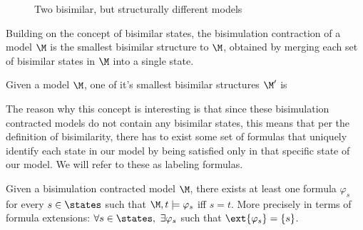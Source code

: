 \begin{figure}[h]
	\label{fig:bisimmods}
	\caption{Two bisimilar, but structurally different models}
	\centering
\end{figure}

Building on the concept of bisimilar states, the bisimulation contraction of a model $\M$ is the smallest bisimilar structure to $\M$, obtained by merging each set of bisimilar states in $\M$ into a single state. 

\begin{definition}
	\label{def:bisimContract}
	Given a model $\M$, one of it's smallest bisimilar structures $\M'$ is 
\end{definition}

The reason why this concept is interesting is that since these bisimulation contracted models do not contain any bisimilar states, this means that per the definition of bisimilarity, there has to exist some set of formulas that uniquely identify each state in our model by being satisfied only in that specific state of our model. We will refer to these as labeling formulas.

\begin{definition}
	\label{def:label}
	Given a bisimulation contracted model $\M$, there exists at least one formula $\varphi_s$ for every $s\in\states$ such that $\M,t \models \varphi_s$ iff $s = t$. More precisely in terms of formula extensions: 
	\centering
	$\forall s\in\states,~\exists\varphi_s$ such that $\ext{\varphi_s} = \{s\}$.
\end{definition}

